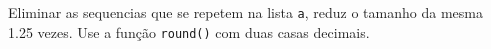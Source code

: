 \documentclass[12pt,varwidth=16cm,border=1pt]{standalone}
\begin{document}
Eliminar as sequencias que se repetem na lista \verb+a+, reduz o tamanho da mesma 1.25 vezes. Use a função \verb+round()+ com duas casas decimais.

\questiomtrue
\end{document}
